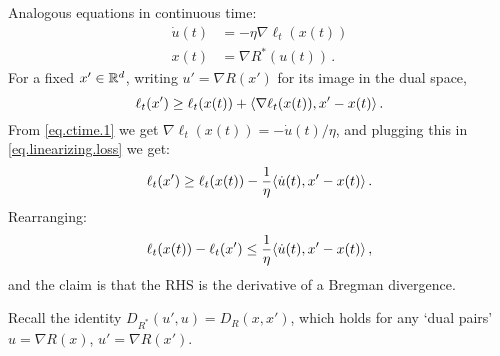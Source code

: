 \documentclass[12pt]{article}
\theoremstyle{plain}
\theoremstyle{definition}
\theoremstyle{remark}
\begin{document}
Analogous equations in continuous time:
\begin{align*}
\dot{u}(t) &= - \eta \nabla \ell_{t}(x(t)) \label{eq.ctime.1} \tag{1ct} \\
x(t) &= \nabla R^{*}(u(t))\,. \label{eq.ctime.2} \tag{2ct}
\end{align*}
For a fixed $x' \in \mathbb{R}^d$, writing $u' = \nabla R(x')$ for its image in the dual space,
\setcounter{equation}{3}
\begin{equation}
\ell_{t}(x') \geq \ell_{t}(x(t)) + \langle {\nabla\ell_t(x(t)), x' - x(t)}\rangle\,. \label{eq.linearizing.loss}
\end{equation}
From \eqref{eq.ctime.1} we get $\nabla \ell_{t}(x(t)) = -\dot{u}(t)/\eta$,
and plugging this in \eqref{eq.linearizing.loss} we get:
\[
\ell_{t}(x') \geq \ell_{t}(x(t)) - \frac{1}{\eta} \langle {\dot{u}(t), x' - x(t)}\rangle\,.
\]
Rearranging:
\begin{equation}
\ell_{t}(x(t)) - \ell_{t}(x') \leq  \frac{1}{\eta} \langle {\dot{u}(t), x' - x(t)}\rangle\,, \label{eq.loss.prep}
\end{equation}
and the claim is that the RHS is the derivative of a Bregman divergence.

\bigskip

Recall the identity $D_{R^{*}}(u', u) = D_{R}(x,x')$, which holds for any `dual pairs'
$u = \nabla R (x)$, $u' = \nabla R (x')$.

\bigskip
\end{document}
